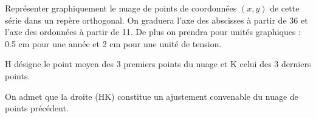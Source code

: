 \begin{questions}
	\question[] Représenter graphiquement le nuage de points de coordonnées $(x,y)$ de cette série dans un repère orthogonal. 
	On graduera l'axe des abscisses à partir de 36 et l'axe des ordonnées à partir de 11.
	De plus on prendra pour unités graphiques : \num{0.5} cm pour une année et 2 cm pour une unité de tension.
	
	\question[] H désigne le point moyen des 3 premiers points du nuage et K celui des 3 derniers points.
	
	\question[] On admet que la droite (HK) constitue un ajustement convenable du nuage de points précédent.
\end{questions}